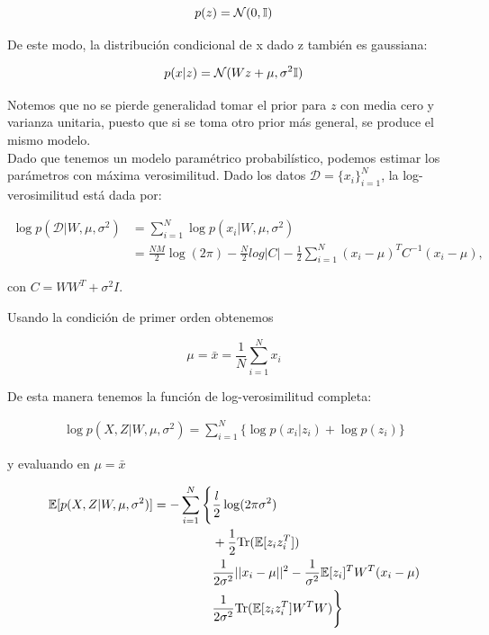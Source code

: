 \begin{equation}
p(z) = \mathcal{N}(0,{\mathbb I})
\end{equation}

De este modo, la distribución condicional de x dado z también es gaussiana:

\begin{equation}
p(x|z) = \mathcal{N}(Wz+\mu,\sigma^2{\mathbb I})
\end{equation}

Notemos que no se pierde generalidad tomar el prior para $z$ con media cero y varianza unitaria, puesto que si se toma otro prior más general, se produce el mismo modelo.\\


Dado que tenemos un modelo paramétrico probabilístico, podemos estimar los parámetros con máxima verosimilitud. Dado los datos $\mathcal{D} = \{x_i\}_{i=1}^N$, la log-verosimilitud está dada por:

\begin{align}
\log p(\mathcal{D}|W,\mu, \sigma^2) & = \sum_{i=1}^N \log p(x_i|W,\mu, \sigma^2)\\
& = \frac{NM}{2}\log (2\pi) - \frac{N}{2}log|C| - \frac{1}{2}\sum_{i=1}^N (x_i-\mu)^T C^{-1} (x_i-\mu),
\end{align}

con $C = WW^T + \sigma^2 I$.

Usando la condición de primer orden obtenemos

\begin{equation}
	\mu = \bar{x} = \frac{1}{N}\sum_{i=1}^N x_i
\end{equation}

De esta manera tenemos la función de log-verosimilitud completa:

\begin{align}
    \log p(X, Z|W, \mu, \sigma^2) = \sum_{i=1}^N \{\log p(x_i|z_i) + \log p(z_i)\}
\end{align}

y evaluando en $\mu = \bar{x}$

\begin{align}
\notag \mathbb{E}[ p(X,Z |W, \mu, \sigma^2) ] =  -\sum_{i=1}^N \Bigg\{ &\frac{l}{2} \log (2\pi \sigma^2)\\
\notag & + \frac{1}{2}\text{Tr}(\mathbb{E}[z_iz_i^T])\\
\notag & \frac{1}{2\sigma^2}||x_i - \mu||^2 - \frac{1}{\sigma^2}\mathbb{E}[z_i]^T W^T (x_i - \mu)\\
& \frac{1}{2\sigma^2} \text{Tr}(\mathbb{E}[z_iz_i^T]W^T W) \Bigg\}
\end{align}

